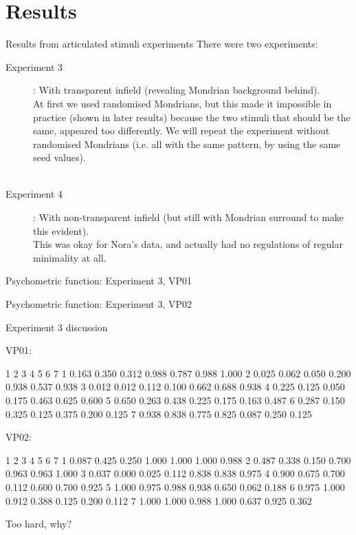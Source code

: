 \documentclass{beamer}
\begin{document}
\section{Results}
\begin{frame}[t]{Results from articulated stimuli experiments}
There were two experiments:\\

\begin{description}
\item[Experiment 3]:  With transparent infield (revealing Mondrian background behind).\\
At first we used randomised Mondrians, but this made it impossible in practice (shown in later results) because the two stimuli that should be the same, appeared too differently. We will repeat the experiment without randomised Mondrians (i.e. all with the same pattern, by using the same seed values).\\
~\\

\item[Experiment 4]:  With non-transparent infield (but still with Mondrian surround to make this evident).\\
 This was okay for Nora's data, and actually had no regulations of regular minimality at all.

\end{description}
\end{frame}


\begin{frame}[t]{Psychometric function: Experiment 3, VP01}
\end{frame}

\begin{frame}[t]{Psychometric function: Experiment 3, VP02}
\end{frame}

\begin{frame}[t]{Experiment 3 discussion}

VP01:

1
2
3
4
5
6
7
1
0.163
0.350
0.312
0.988
0.787
0.988
1.000
2
0.025
0.062
0.050
0.200
0.938
0.537
0.938
3
0.012
0.012
0.112
0.100
0.662
0.688
0.938
4
0.225
0.125
0.050
0.175
0.463
0.625
0.600
5
0.650
0.263
0.438
0.225
0.175
0.163
0.487
6
0.287
0.150
0.325
0.125
0.375
0.200
0.125
7
0.938
0.838
0.775
0.825
0.087
0.250
0.125


VP02:

1
2
3
4
5
6
7
1
0.087
0.425
0.250
1.000
1.000
1.000
0.988
2
0.487
0.338
0.150
0.700
0.963
0.963
1.000
3
0.037
0.000
0.025
0.112
0.838
0.838
0.975
4
0.900
0.675
0.700
0.112
0.600
0.700
0.925
5
1.000
0.975
0.988
0.938
0.650
0.062
0.188
6
0.975
1.000
0.912
0.388
0.125
0.200
0.112
7
1.000
1.000
0.988
1.000
0.637
0.925
0.362


Too hard, why?

\end{frame}
\end{document}
